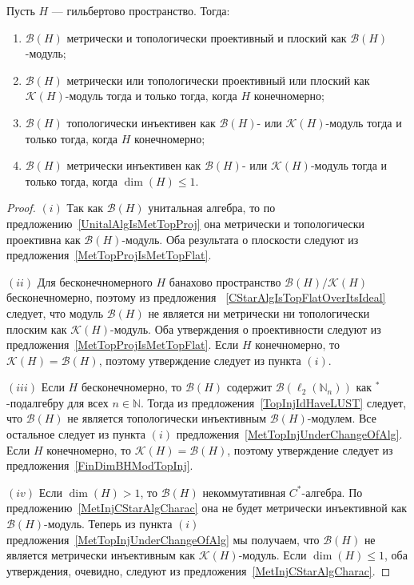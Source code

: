 \begin{proposition}\label{KHAndBHModBH} Пусть $H$ --- гильбертово пространство.
Тогда:

\begin{enumerate}[label = (\roman*)]
    \item $\mathcal{B}(H)$ метрически и топологически проективный и плоский как
    $\mathcal{B}(H)$-модуль;

    \item $\mathcal{B}(H)$ метрически или топологически проективный 
    или плоский как $\mathcal{K}(H)$-модуль тогда и 
    только тогда, когда $H$ конечномерно;

    \item $\mathcal{B}(H)$ топологически инъективен как $\mathcal{B}(H)$- или
    $\mathcal{K}(H)$-модуль тогда и только тогда, когда $H$ конечномерно;

    \item $\mathcal{B}(H)$ метрически инъективен как $\mathcal{B}(H)$- или
    $\mathcal{K}(H)$-модуль тогда и только тогда, когда $\dim(H)\leq 1$.
\end{enumerate}
\end{proposition}
\begin{proof} $(i)$ Так как $\mathcal{B}(H)$ унитальная алгебра, то по
предложению~\ref{UnitalAlgIsMetTopProj} она метрически и топологически
проективна как $\mathcal{B}(H)$-модуль. Оба результата о плоскости следуют из
предложения~\ref{MetTopProjIsMetTopFlat}.

$(ii)$ Для бесконечномерного $H$ банахово пространство
$\mathcal{B}(H)/\mathcal{K}(H)$ бесконечномерно, поэтому из предложения
~\ref{CStarAlgIsTopFlatOverItsIdeal} следует, что модуль $\mathcal{B}(H)$ не
является ни метрически ни топологически плоским как $\mathcal{K}(H)$-модуль. Оба
утверждения о проективности следуют из предложения~\ref{MetTopProjIsMetTopFlat}.
Если $H$ конечномерно, то $\mathcal{K}(H)=\mathcal{B}(H)$, поэтому утверждение
следует из пункта $(i)$.

$(iii)$ Если $H$ бесконечномерно, то $\mathcal{B}(H)$ содержит
$\mathcal{B}(\ell_2(\mathbb{N}_n))$ как ${}^*$-подалгебру для всех
$n\in\mathbb{N}$. Тогда из предложения~\ref{TopInjIdHaveLUST} следует, что
$\mathcal{B}(H)$ не является топологически инъективным $\mathcal{B}(H)$-модулем.
Все остальное следует из пункта $(i)$
предложения~\ref{MetTopInjUnderChangeOfAlg}. Если $H$ конечномерно, то
$\mathcal{K}(H)=\mathcal{B}(H)$, поэтому утверждение следует из
предложения~\ref{FinDimBHModTopInj}.

$(iv)$ Если $\dim(H)>1$, то $\mathcal{B}(H)$ некоммутативная $C^*$-алгебра. По
предложению~\ref{MetInjCStarAlgCharac} она не будет метрически инъективной как
$\mathcal{B}(H)$-модуль. Теперь из пункта $(i)$
предложения~\ref{MetTopInjUnderChangeOfAlg} мы получаем, что $\mathcal{B}(H)$ не
является метрически инъективным как $\mathcal{K}(H)$-модуль. Если 
$\dim(H)\leq 1$, оба утверждения, очевидно, следуют из
предложения~\ref{MetInjCStarAlgCharac}.
\end{proof}

